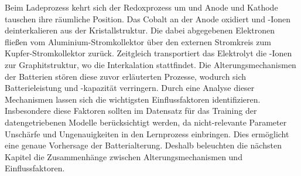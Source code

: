 Beim Ladeprozess kehrt sich der Redoxprozess um und Anode und Kathode tauschen ihre räumliche Position. Das Cobalt an der Anode oxidiert und -Ionen deinterkalieren aus der Kristallstruktur. Die dabei abgegebenen Elektronen fließen vom Aluminium-Stromkollektor über den externen Stromkreis zum Kupfer-Stromkollektor zurück. Zeitgleich transportiert das Elektrolyt die -Ionen zur Graphitstruktur, wo die Interkalation stattfindet.
Die Alterungsmechanismen der Batterien stören diese zuvor erläuterten Prozesse, wodurch sich Batterieleistung und -kapazität verringern. Durch eine Analyse dieser Mechanismen lassen sich die wichtigsten Einflussfaktoren identifizieren. Insbesondere diese Faktoren sollten im Datensatz für das Training der datengetriebenen Modelle berücksichtigt werden, da nicht-relevante Parameter Unschärfe und Ungenauigkeiten in den Lernprozess einbringen. Dies ermöglicht eine genaue Vorhersage der Batterialterung. Deshalb beleuchten die nächsten Kapitel die Zusammenhänge zwischen Alterungsmechanismen und Einflussfaktoren.


